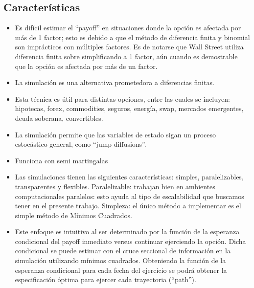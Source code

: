 \documentclass[12pt,reqno,letter]{article}
\begin{document}
	\subsection{Características}
	\begin{itemize}
		\item Es difícil estimar el “payoff” en situaciones donde la opción es afectada por más de 1 factor; esto es debido a que el método de diferencia finita y binomial son imprácticos con múltiples factores. Es de notarse que Wall Street utiliza diferencia finita sobre simplificando a 1 factor, aún cuando es demostrable que la opción es afectada por más de un factor.
		\item La simulación es una alternativa prometedora a diferencias finitas. 
		\item Esta técnica es útil para distintas opciones, entre las cuales se incluyen: hipotecas, forex, commodities, seguros, energía, swap, mercados emergentes, deuda soberana, convertibles.
		\item La simulación permite que las variables de estado sigan un proceso estocástico general, como “jump diffusions”.
		\item Funciona con semi martingalas
		\item Las simulaciones tienen las siguientes características: simples, paralelizables, transparentes y flexibles.
			\subitem Paralelizable: trabajan bien en ambientes computacionales paralelos: esto ayuda al tipo de escalabilidad que buscamos tener en el presente trabajo.
			\subitem Simpleza: el único método a implementar es el simple método de Mínimos Cuadrados.
		
		\item Este enfoque es intuitivo al ser determinado por la función de la esperanza condicional del payoff inmediato versus continuar ejerciendo la opción. Dicha condicional se puede estimar con el cruce seccional de información en la simulación utilizando mínimos cuadrados.
		Obteniendo la función de la esperanza condicional para cada fecha del ejercicio se podrá obtener la especificación óptima para ejercer cada trayectoria (“path”).
		

\end{itemize}
\end{document}
